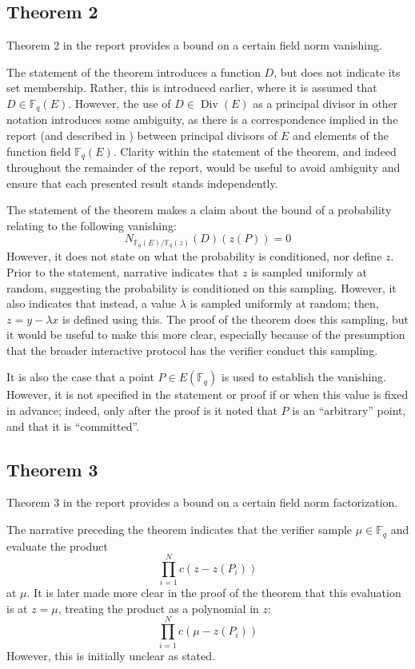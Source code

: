 \documentclass{article}
\begin{document}
\subsection{Theorem 2}

Theorem 2 in the report provides a bound on a certain field norm vanishing.

The statement of the theorem introduces a function $D$, but does not indicate its set membership.
Rather, this is introduced earlier, where it is assumed that $D \in \mathbb{F}_q(E)$.
However, the use of $D \in \operatorname{Div}(E)$ as a principal divisor in other notation introduces some ambiguity, as there is a correspondence implied in the report (and described in \cite{ecip}) between principal divisors of $E$ and elements of the function field $\mathbb{F}_q(E)$.
Clarity within the statement of the theorem, and indeed throughout the remainder of the report, would be useful to avoid ambiguity and ensure that each presented result stands independently.

The statement of the theorem makes a claim about the bound of a probability relating to the following vanishing:
$$N_{\mathbb{F}_q(E) / \mathbb{F}_q(z)}(D)(z(P)) = 0$$
However, it does not state on what the probability is conditioned, nor define $z$.
Prior to the statement, narrative indicates that $z$ is sampled uniformly at random, suggesting the probability is conditioned on this sampling.
However, it also indicates that instead, a value $\lambda$ is sampled uniformly at random; then, $z = y - \lambda x$ is defined using this.
The proof of the theorem does this sampling, but it would be useful to make this more clear, especially because of the presumption that the broader interactive protocol has the verifier conduct this sampling.

It is also the case that a point $P \in E(\mathbb{F}_q)$ is used to establish the vanishing.
However, it is not specified in the statement or proof if or when this value is fixed in advance; indeed, only after the proof is it noted that $P$ is an ``arbitrary'' point, and that it is ``committed''.


\subsection{Theorem 3}

Theorem 3 in the report provides a bound on a certain field norm factorization.

The narrative preceding the theorem indicates that the verifier sample $\mu \in \mathbb{F}_q$ and evaluate the product
$$\prod_{i=1}^N c(z - z(P_i))$$
at $\mu$.
It is later made more clear in the proof of the theorem that this evaluation is at $z = \mu$, treating the product as a polynomial in $z$:
$$\prod_{i=1}^N c(\mu - z(P_i))$$
However, this is initially unclear as stated.
\end{document}
